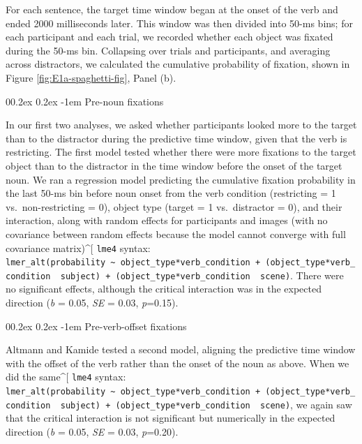 \documentclass[
  man,floatsintext]{apa6}
\makeatletter
\let\oldparagraph\paragraph
\renewcommand{\paragraph}[1]{\oldparagraph{#1}\mbox{}}
\renewcommand{\paragraph}{\@startsection{paragraph}{4}{\parindent}%
  {0\baselineskip \@plus 0.2ex \@minus 0.2ex}%
  {-1em}%
  {\normalfont\normalsize\bfseries\itshape\typesectitle}}
\makeatother
\begin{document}
For each sentence, the target time window began at the onset of the verb and ended 2000 milliseconds later. This window was then divided into 50-ms bins; for each participant and each trial, we recorded whether each object was fixated during the 50-ms bin. Collapsing over trials and participants, and averaging across distractors, we calculated the cumulative probability of fixation, shown in Figure \ref{fig:E1a-spaghetti-fig}, Panel (b).

\paragraph{Pre-noun fixations}\label{pre-noun-fixations}

In our first two analyses, we asked whether participants looked more to the target than to the distractor during the predictive time window, given that the verb is restricting. The first model tested whether there were more fixations to the target object than to the distractor in the time window before the onset of the target noun. We ran a regression model predicting the cumulative fixation probability in the last 50-ms bin before noun onset from the verb condition (restricting = 1 vs.~non-restricting = 0), object type (target = 1 vs.~distractor = 0), and their interaction, along with random effects for participants and images (with no covariance between random effects because the model cannot converge with full covariance matrix)\^{}{[} \texttt{lme4} syntax: \texttt{lmer\_alt(probability\ \textasciitilde{}\ object\_type*verb\_condition\ +\ (object\_type*verb\_condition\ \textbar{}\textbar{}\ subject)\ +\ (object\_type*verb\_condition\ \textbar{}\textbar{}\ scene)}. There were no significant effects, although the critical interaction was in the expected direction (\emph{b} = 0.05, \emph{SE} = 0.03, \emph{p}=0.15).

\paragraph{Pre-verb-offset fixations}\label{pre-verb-offset-fixations}

Altmann and Kamide tested a second model, aligning the predictive time window with the offset of the verb rather than the onset of the noun as above. When we did the same\^{}{[} \texttt{lme4} syntax: \texttt{lmer\_alt(probability\ \textasciitilde{}\ object\_type*verb\_condition\ +\ (object\_type*verb\_condition\ \textbar{}\textbar{}\ subject)\ +\ (object\_type*verb\_condition\ \textbar{}\textbar{}\ scene)}, we again saw that the critical interaction is not significant but numerically in the expected direction (\emph{b} = 0.05, \emph{SE} = 0.03, \emph{p}=0.20).
\end{document}
